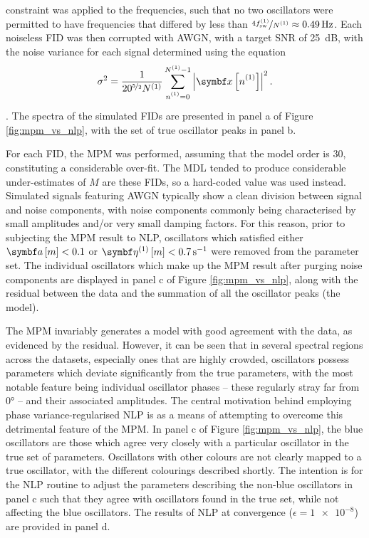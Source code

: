 constraint was applied to the frequencies,
such that no two oscillators were permitted to have frequencies that differed
by less than $\nicefrac{4 f_{\mathrm{sw}}^{(1)}}{N^{(1)}} \approx \qty{0.49}{\hertz}$. Each
noiseless \ac{FID} was then corrupted with \ac{AWGN}, with a target \ac{SNR} of
\qty{25}{\deci\bel}, with the noise variance for each signal determined using
the equation
\begin{equation}
    \sigma^2 = \frac{1}{ 20^{\nicefrac{5}{2}}\None}
        \sum_{\none=0}^{\None-1}
        \left \lvert \bx \left[\none\right] \right \rvert^2.
\end{equation}
.
The spectra of the simulated
\acp{FID} are presented in panel a of Figure \ref{fig:mpm_vs_nlp}, with the set
of true oscillator peaks in panel b.

For each \ac{FID}, the \ac{MPM} was performed, assuming that the model order is
30, constituting a considerable over-fit. The \ac{MDL} tended to produce
considerable under-estimates of $M$ are these \acp{FID}, so a hard-coded value
was used instead. Simulated signals featuring \ac{AWGN} typically show a
clean division between signal and noise components, with noise components
commonly being characterised by small amplitudes and/or very small damping
factors. For this reason, prior to subjecting the \ac{MPM} result to \ac{NLP},
oscillators which satisfied either $\bdam < 0.1$ or  $\bdetaonem <
\qty{0.7}{\per\second}$ were removed from the parameter set. The individual
oscillators which make up the \ac{MPM} result after purging noise components
are displayed in panel c of Figure \ref{fig:mpm_vs_nlp}, along with the
residual between the data and the summation of all the oscillator peaks (the
model).


The \ac{MPM} invariably generates a model with good agreement with the data, as
evidenced by the residual.
However, it can be seen that in several spectral regions across the datasets,
especially ones that are highly crowded, oscillators possess parameters which
deviate significantly from the true parameters, with the most notable feature
being individual oscillator phases -- these regularly stray far from \ang{0} --
and their associated amplitudes. The central motivation behind employing phase
variance-regularised \ac{NLP} is as a means of attempting to overcome this
detrimental feature of the \ac{MPM}.
In panel c of Figure \ref{fig:mpm_vs_nlp}, the blue oscillators are those which
agree very closely with a particular oscillator in the true set of parameters.
Oscillators with other colours are not clearly mapped to a true oscillator,
with the different colourings described shortly.
The intention is for the \ac{NLP} routine to adjust the parameters describing
the non-blue oscillators in panel c such that they agree with oscillators found
in the true set, while not affecting the blue oscillators.
The results of \ac{NLP} at convergence ($\epsilon = \num{1e-8}$) are provided
in panel d.

